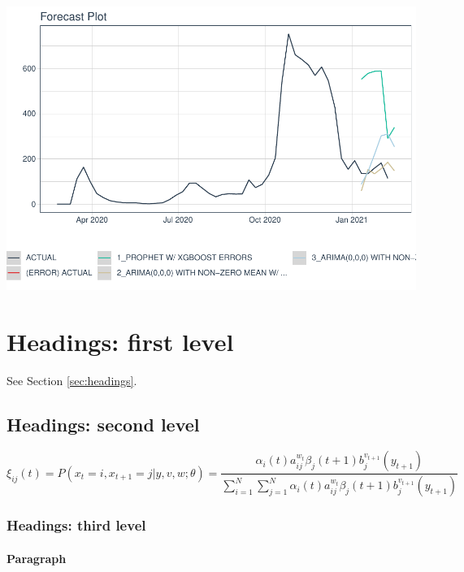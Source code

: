 \documentclass{article}
\begin{document}
\includegraphics{paper_files/figure-latex/unnamed-chunk-5-1.pdf}

\hypertarget{headings-first-level}{%
\section{Headings: first level}\label{headings-first-level}}

\label{sec:headings}

\lipsum[4] See Section \ref{sec:headings}.

\hypertarget{headings-second-level}{%
\subsection{Headings: second level}\label{headings-second-level}}

\lipsum[5]

\[
\xi _{ij}(t)=P(x_{t}=i,x_{t+1}=j|y,v,w;\theta)= {\frac {\alpha _{i}(t)a^{w_t}_{ij}\beta _{j}(t+1)b^{v_{t+1}}_{j}(y_{t+1})}{\sum _{i=1}^{N} \sum _{j=1}^{N} \alpha _{i}(t)a^{w_t}_{ij}\beta _{j}(t+1)b^{v_{t+1}}_{j}(y_{t+1})}}
\]

\hypertarget{headings-third-level}{%
\subsubsection{Headings: third level}\label{headings-third-level}}

\lipsum[6]

\paragraph{Paragraph}
\lipsum[7]
\end{document}
